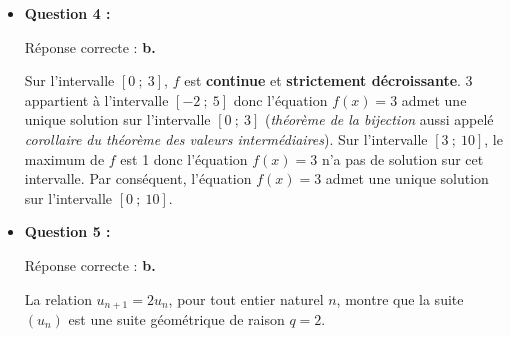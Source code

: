\begin{corrige}
\begin{itemize}
{               \par
          }
          \par
          \item \textbf{Question 4 :}
          \par
          Réponse correcte :\quad\textbf{ b.}
          \par
          Sur l'intervalle $[0~;~3]$, $f$ est \textbf{continue} et \textbf{strictement décroissante}. 3 appartient à l'intervalle $[-2~;~5]$ donc l'équation ${f(x)=3}$ admet une unique solution sur l'intervalle $[0~;~3]$ (\textit{théorème de la bijection} aussi appelé \textit{corollaire du théorème des valeurs intermédiaires}).
          Sur l'intervalle $[3~;~10]$, le maximum de $f$ est 1 donc l'équation ${f(x)=3}$ n'a pas de solution sur cet intervalle.
          Par conséquent, l'équation $f(x)=3$ admet une unique solution sur l'intervalle $[0~;~10]$.
          \par
          \item \textbf{Question 5 :}
          \par
          Réponse correcte :\quad\textbf{ b.}
          \par
          La relation $u_{n+1}=2u_n$, pour tout entier naturel $n$, montre que la suite $(u_n)$ est une suite géométrique de raison $q=2$.

\end{itemize}
\end{corrige}
